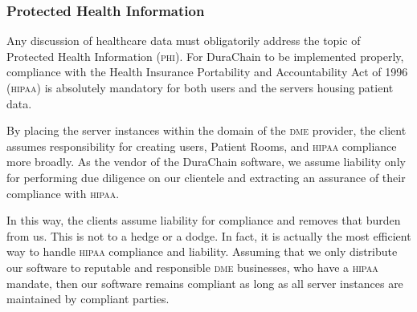 \subsubsection{Protected Health Information}
Any discussion of healthcare data must obligatorily address the topic of Protected Health Information (\textsc{phi}). For DuraChain to be implemented properly, compliance with the Health Insurance Portability and Accountability Act of 1996 (\textsc{hipaa})\cite{HIPAA} is absolutely mandatory for both users and the servers housing patient data.%

By placing the server instances within the domain of the \textsc{dme} provider, the client assumes responsibility for creating users, Patient Rooms, and \textsc{hipaa} compliance more broadly. As the vendor of the DuraChain software, we assume liability only for performing due diligence on our clientele and extracting an assurance of their compliance with \textsc{hipaa}.%

In this way, the clients assume liability for compliance and removes that burden from us. This is not to a hedge or a dodge. In fact, it is actually the most efficient way to handle \textsc{hipaa} compliance and liability. Assuming that we only distribute our software to reputable and responsible \textsc{dme} businesses, who have a \textsc{hipaa} mandate, then our software remains compliant as long as all server instances are maintained by compliant parties.%
